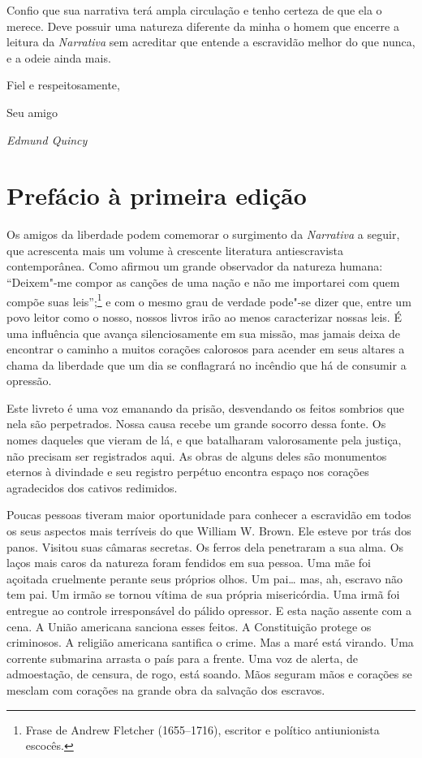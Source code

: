 Confio que sua narrativa terá ampla circulação e tenho certeza de que
ela o merece. Deve possuir uma natureza diferente da minha o homem que
encerre a leitura da \emph{Narrativa} sem acreditar que entende a escravidão
melhor do que nunca, e a odeie ainda mais.

Fiel e respeitosamente, 

Seu amigo

\begin{flushright}
\emph{Edmund Quincy}
\end{flushright}

\chapter{Prefácio à primeira edição}

Os amigos da liberdade podem comemorar o surgimento da \emph{Narrativa} a
seguir, que acrescenta mais um volume à crescente literatura
antiescravista contemporânea. Como afirmou um grande observador da
natureza humana: ``Deixem"-me compor as canções de uma nação e não me
importarei com quem compõe suas leis'';\footnote{Frase de Andrew Fletcher
  (1655--1716), escritor e político antiunionista escocês.} e com o
mesmo grau de verdade pode"-se dizer que, entre um povo leitor como o
nosso, nossos livros irão ao menos caracterizar nossas leis. É uma
influência que avança silenciosamente em sua missão, mas jamais deixa de
encontrar o caminho a muitos corações calorosos para acender em seus
altares a chama da liberdade que um dia se conflagrará no incêndio que
há de consumir a opressão.

Este livreto é uma voz emanando da prisão, desvendando os feitos
sombrios que nela são perpetrados. Nossa causa recebe um grande socorro
dessa fonte. Os nomes daqueles que vieram de lá, e que batalharam
valorosamente pela justiça, não precisam ser registrados aqui. As obras
de alguns deles são monumentos eternos à divindade e seu registro
perpétuo encontra espaço nos corações agradecidos dos cativos redimidos.

Poucas pessoas tiveram maior oportunidade para conhecer a escravidão em
todos os seus aspectos mais terríveis do que William W. Brown. Ele
esteve por trás dos panos. Visitou suas câmaras secretas. Os ferros dela
penetraram a sua alma. Os laços mais caros da natureza foram fendidos em
sua pessoa. Uma mãe foi açoitada cruelmente perante seus próprios olhos.
Um pai\ldots{} mas, ah, escravo não tem pai. Um irmão se tornou vítima
de sua própria misericórdia. Uma irmã foi entregue ao controle
irresponsável do pálido opressor. E esta nação assente com a cena. A
União americana sanciona esses feitos. A Constituição protege os
criminosos. A religião americana santifica o crime. Mas a maré está
virando. Uma corrente submarina arrasta o país para a frente. Uma voz de
alerta, de admoestação, de censura, de rogo, está soando. Mãos seguram
mãos e corações se mesclam com corações na grande obra da salvação dos
escravos.

